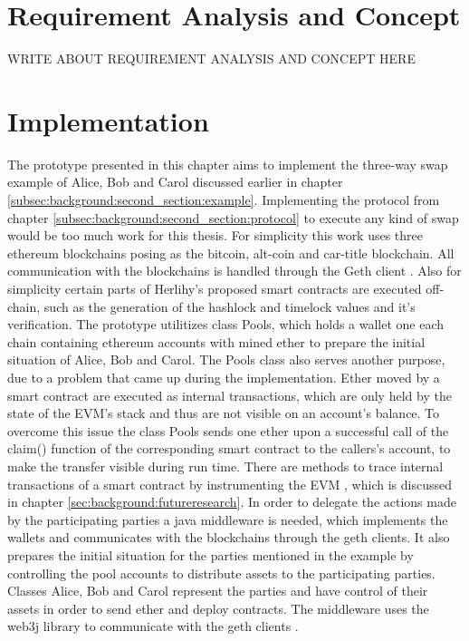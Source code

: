 \chapter{Requirement Analysis and Concept}
\label{ch:chapter03}
WRITE ABOUT REQUIREMENT ANALYSIS AND CONCEPT HERE

\chapter{Implementation}
\label{ch:chapter04}
The prototype presented in this chapter aims to implement the three-way swap example of Alice, Bob and Carol discussed earlier in chapter \ref{subsec:background:second_section:example}. Implementing the protocol from chapter \ref{subsec:background:second_section:protocol} to execute any kind of swap would be too much work for this thesis. For simplicity this work uses three ethereum blockchains posing as the bitcoin, alt-coin and car-title blockchain. All communication with the blockchains is handled through the Geth client \cite{gethclient}. Also for simplicity certain parts of Herlihy's proposed smart contracts are executed off-chain, such as the generation of the hashlock and timelock values and it's verification. The prototype utilitizes class Pools, which holds a wallet one each chain containing ethereum accounts with mined ether to prepare the initial situation of Alice, Bob and Carol. The Pools class also serves another purpose, due to a problem that came up during the implementation. Ether moved by a smart contract are executed as internal transactions, which are only held by the state of the \ac{EVM}'s stack and thus are not visible on an account's balance. To overcome this issue the class Pools sends one ether upon a successful call of the claim() function of the corresponding smart contract to the callers's account, to make the transfer visible during run time. There are methods to trace internal transactions of a smart contract by instrumenting the \ac{EVM} \cite{instrumentingEVM}, which is discussed in chapter \ref{sec:background:futureresearch}. In order to delegate the actions made by the participating parties a java middleware is needed, which implements the wallets and communicates with the blockchains through the geth clients. It also prepares the initial situation for the parties mentioned in the example by controlling the pool accounts to distribute assets to the participating parties. Classes Alice, Bob and Carol represent the parties and have control of their assets in order to send ether and deploy contracts. The middleware uses the web3j library to communicate with the geth clients \cite{web3j}.



